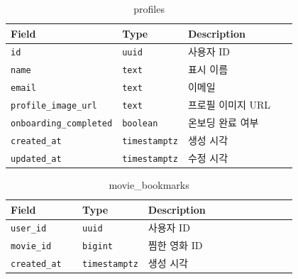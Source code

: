 \documentclass[11pt,a4paper]{article}
\renewcommand{\arraystretch}{1.18}
\begin{document}
\begin{table}[H]
\centering
\footnotesize
\setlength{\tabcolsep}{5pt}
\renewcommand{\arraystretch}{1.28}
\begin{tabularx}{\linewidth}{@{}>{\RaggedRight\arraybackslash}p{0.25\linewidth}>{\RaggedRight\arraybackslash}p{0.22\linewidth}>{\RaggedRight\arraybackslash}X@{}}
\toprule
\textbf{Field} & \textbf{Type} & \textbf{Description} \\
\midrule
\texttt{id} & \texttt{uuid} & 사용자 ID \\
\texttt{name} & \texttt{text} & 표시 이름 \\
\texttt{email} & \texttt{text} & 이메일 \\
\texttt{profile\_\allowbreak{}image\_\allowbreak{}url} & \texttt{text} & 프로필 이미지 URL \\
\texttt{onboarding\_\allowbreak{}completed} & \texttt{boolean} & 온보딩 완료 여부 \\
\texttt{created\_\allowbreak{}at} & \texttt{timestamptz} & 생성 시각 \\
\texttt{updated\_\allowbreak{}at} & \texttt{timestamptz} & 수정 시각 \\
\bottomrule
\end{tabularx}
\caption{profiles}
\end{table}

\begin{table}[H]
\centering
\footnotesize
\setlength{\tabcolsep}{5pt}
\renewcommand{\arraystretch}{1.28}
\begin{tabularx}{\linewidth}{@{}>{\RaggedRight\arraybackslash}p{0.25\linewidth}>{\RaggedRight\arraybackslash}p{0.22\linewidth}>{\RaggedRight\arraybackslash}X@{}}
\toprule
\textbf{Field} & \textbf{Type} & \textbf{Description} \\
\midrule
\texttt{user\_\allowbreak{}id} & \texttt{uuid} & 사용자 ID \\
\texttt{movie\_\allowbreak{}id} & \texttt{bigint} & 찜한 영화 ID \\
\texttt{created\_\allowbreak{}at} & \texttt{timestamptz} & 생성 시각 \\
\bottomrule
\end{tabularx}
\caption{movie\_bookmarks}
\end{table}
\end{document}

